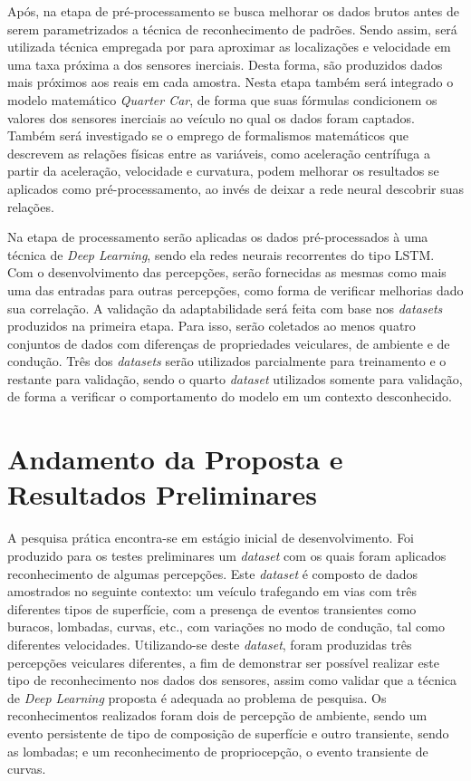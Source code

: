 Após, na etapa de pré-processamento se busca melhorar os dados brutos antes de serem parametrizados a técnica de reconhecimento de padrões. Sendo assim, será utilizada técnica empregada por \cite{Li2018} para aproximar as localizações e velocidade em uma taxa próxima a dos sensores inerciais. Desta forma, são produzidos dados mais próximos aos reais em cada amostra. Nesta etapa também será integrado o modelo matemático \textit{Quarter Car}, de forma que suas fórmulas condicionem os valores dos sensores inerciais ao veículo no qual os dados foram captados. Também será investigado se o emprego de formalismos matemáticos que descrevem as relações físicas entre as variáveis, como aceleração centrífuga a partir da aceleração, velocidade e curvatura, podem melhorar os resultados se aplicados como pré-processamento, ao invés de deixar a rede neural descobrir suas relações.

Na etapa de processamento serão aplicadas os dados pré-processados à uma técnica de \textit{Deep Learning}, sendo ela redes neurais recorrentes do tipo LSTM. Com o desenvolvimento das percepções, serão fornecidas as mesmas como mais uma das entradas para outras percepções, como forma de verificar melhorias dado sua correlação. A validação da adaptabilidade será feita com base nos \textit{datasets} produzidos na primeira etapa. Para isso, serão coletados ao menos quatro conjuntos de dados com diferenças de propriedades veiculares, de ambiente e de condução. Três dos \textit{datasets} serão utilizados parcialmente para treinamento e o restante para validação, sendo o quarto \textit{dataset} utilizados somente para validação, de forma a verificar o comportamento do modelo em um contexto desconhecido.

\section{Andamento da Proposta e Resultados Preliminares}

A pesquisa prática encontra-se em estágio inicial de desenvolvimento. Foi produzido para os testes preliminares um \textit{dataset} com os quais foram aplicados reconhecimento de algumas percepções. Este \textit{dataset} é composto de dados amostrados no seguinte contexto: um veículo trafegando em vias com três diferentes tipos de superfície, com a presença de eventos transientes como buracos, lombadas, curvas, etc., com variações no modo de condução, tal como diferentes velocidades. Utilizando-se deste \textit{dataset}, foram produzidas três percepções veiculares diferentes, a fim de demonstrar ser possível realizar este tipo de reconhecimento nos dados dos sensores, assim como validar que a técnica de \textit{Deep Learning} proposta é adequada ao problema de pesquisa. Os reconhecimentos realizados foram dois de percepção de ambiente, sendo um evento persistente de tipo de composição de superfície e outro transiente, sendo as lombadas; e um reconhecimento de propriocepção, o evento transiente de curvas.

